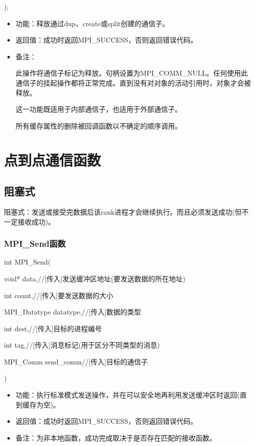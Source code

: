 \documentclass[UTF8]{article}%
\begin{document}
);

\begin{itemize}
    \item 功能：释放通过dup、create或split创建的通信子。
    \item 返回值：成功时返回MPI\_SUCCESS，否则返回错误代码。
    \item 备注：
    
    此操作将通信子标记为释放。句柄设置为MPI\_COMM\_NULL。任何使用此通信子的挂起操作都将正常完成。直到没有对对象的活动引用时，对象才会被释放。

    这一功能既适用于内部通信子，也适用于外部通信子。
    
    所有缓存属性的删除被回调函数以不确定的顺序调用。

\end{itemize}

\section{点到点通信函数}

\subsection{阻塞式}

阻塞式：发送或接受完数据后该rank进程才会继续执行。而且必须发送成功(但不一定接收成功)。

\subsubsection{MPI\_Send函数}

int MPI\_Send(

    \qquad void* data,//[传入]发送缓冲区地址(要发送数据的所在地址)

    \qquad int count,//[传入]要发送数据的大小

    \qquad MPI\_Datatype datatype,//[传入]数据的类型

    \qquad int dest,//[传入]目标的进程编号

    \qquad int tag,//[传入]消息标记(用于区分不同类型的消息)

    \qquad MPI\_Comm send\_comm//[传入]目标的通信子
    
    )

\begin{itemize}
    \item 功能：执行标准模式发送操作，并在可以安全地再利用发送缓冲区时返回(直到缓存为空)。
    \item 返回值：成功时返回MPI\_SUCCESS，否则返回错误代码。
    \item 备注：为非本地函数，成功完成取决于是否存在匹配的接收函数。
\end{itemize}
\end{document}

